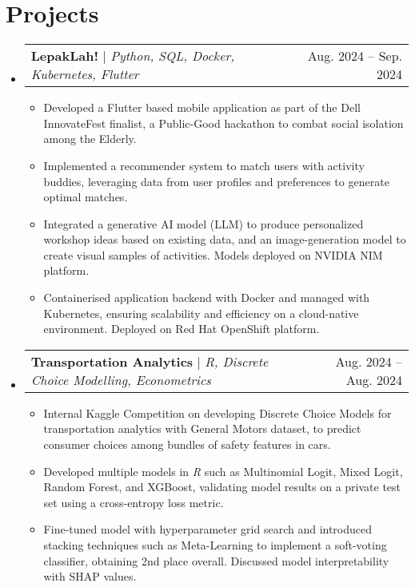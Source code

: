 \documentclass[letterpaper,11pt]{article}
\makeatletter
\newcommand{\resumeItem}[1]{
  \item\small{
    {#1 \vspace{-2pt}}
  }
}
\newcommand{\resumeProjectHeading}[2]{
    \item
    \begin{tabular*}{1.001\textwidth}{l@{\extracolsep{\fill}}r}
      \small#1 & \small #2\\
    \end{tabular*}\vspace{-7pt}
}
\newcommand{\resumeSubHeadingListStart}{\begin{itemize}[leftmargin=0.0in, label={}]}
\newcommand{\resumeSubHeadingListEnd}{\end{itemize}}
\newcommand{\resumeItemListStart}{\begin{itemize}}
\newcommand{\resumeItemListEnd}{\end{itemize}\vspace{-5pt}}
\makeatother
\begin{document}
\vspace{-10pt}
\section{Projects}
    \vspace{-5pt}
    \resumeSubHeadingListStart
      \resumeProjectHeading
          {\textbf{LepakLah!} $|$ \emph{Python, SQL, Docker, Kubernetes, Flutter}}{Aug. 2024 -- Sep. 2024}
          \resumeItemListStart
            \resumeItem{Developed a Flutter based mobile application as part of the Dell InnovateFest finalist, a Public-Good hackathon to combat social isolation among the Elderly.}
            \resumeItem{Implemented a recommender system to match users with activity buddies, leveraging data from user profiles and preferences to generate optimal matches.}
            \resumeItem{Integrated a generative AI model (LLM) to produce personalized workshop ideas based on existing data, and an image-generation model to create visual samples of activities. Models deployed on NVIDIA NIM platform.}
            \resumeItem{Containerised application backend with Docker and managed with Kubernetes, ensuring scalability and efficiency on a cloud-native environment. Deployed on Red Hat OpenShift platform.}
          \resumeItemListEnd
    \vspace{-10pt}
      \resumeProjectHeading
          {\textbf{Transportation Analytics} $|$ \emph{R, Discrete Choice Modelling, Econometrics}}{Aug. 2024 -- Aug. 2024}
          \resumeItemListStart
            \resumeItem{Internal Kaggle Competition on developing Discrete Choice Models for transportation analytics with General Motors dataset, to predict consumer choices among bundles of safety features in cars.}
            \resumeItem{Developed multiple models in \emph{R} such as Multinomial Logit, Mixed Logit, Random Forest, and XGBoost, validating model results on a private test set using a cross-entropy loss metric.}
            \resumeItem{Fine-tuned model with hyperparameter grid search and introduced stacking techniques such as Meta-Learning to implement a soft-voting classifier, obtaining 2nd place overall. Discussed model interpretability with SHAP values.}
          \resumeItemListEnd
    \resumeSubHeadingListEnd
\end{document}
